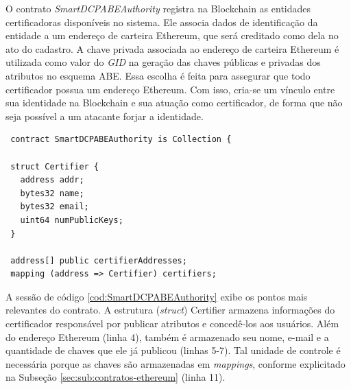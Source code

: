 \documentclass[a4paper,11pt]{article}
\begin{document}
O contrato \emph{SmartDCPABEAuthority} registra na Blockchain as entidades certificadoras disponíveis no sistema. Ele associa dados de identificação da entidade a um endereço de carteira Ethereum, que será creditado como dela no ato do cadastro.
A chave privada associada ao endereço de carteira Ethereum é utilizada como valor do \emph{GID} na geração das chaves públicas e privadas dos atributos no esquema ABE.
Essa escolha é feita para assegurar que todo certificador possua um endereço Ethereum. Com isso, cria-se um vínculo entre sua identidade na Blockchain e sua atuação como certificador, de forma que não seja possível a um atacante forjar a identidade. %



\begin{lstlisting}
 contract SmartDCPABEAuthority is Collection {

 struct Certifier {
   address addr;
   bytes32 name;
   bytes32 email;
   uint64 numPublicKeys;
 }

 address[] public certifierAddresses;
 mapping (address => Certifier) certifiers;
\end{lstlisting}


A sessão de código \ref{cod:SmartDCPABEAuthority} exibe os pontos mais relevantes do contrato.
A estrutura (\textit{struct}) Certifier armazena informações do certificador responsável por publicar atributos e concedê-los aos usuários.
Além do endereço Ethereum (linha 4), também é armazenado seu nome, e-mail e a quantidade de chaves que ele já publicou (linhas 5-7).
Tal unidade de controle é necessária porque as chaves são armazenadas em \emph{mappings}, conforme explicitado na Subseção \ref{sec:sub:contratos-ethereum} (linha 11).
\end{document}
